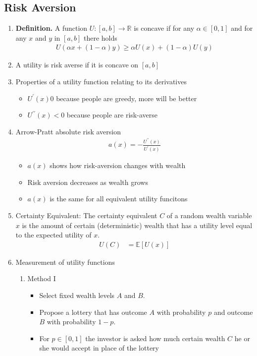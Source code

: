 \documentclass[12pt,twoside]{article}
\begin{document}
\subsection{Risk Aversion}
\begin{enumerate}
	\item \textbf{Definition.} A function $U: [a,b] \rightarrow \mathbb{R}$ is concave if for any $\alpha \in [0,1]$ and for any $x$ and $y$ in $[a,b]$ there holds 
	\begin{align*}
		U\left(\alpha x + (1-\alpha) y\right) \geq \alpha U(x)  + (1-\alpha) U(y)
	\end{align*}

	\item A utility is risk averse if it is concave on $[a,b]$

	\item Properties of a utility function relating to its derivatives
		\begin{itemize}
			\item $U^\prime(x) 0$ because people are greedy, more will be better
			\item $U^{\prime\prime}(x) < 0$  because people are risk-averse
		\end{itemize}

	\item Arrow-Pratt absolute risk aversion 
	\begin{align*}
		a(x) = - \frac{U^{\prime\prime}(x)}{U^\prime(x)}
	\end{align*}
	
		\begin{itemize}
			\item $a(x)$ shows how risk-aversion changes with wealth
			\item Risk aversion decreases as wealth grows
			\item $a(x)$ is the same for all equivalent utility funcitons
		\end{itemize}
		
	\item Certainty Equivalent: The certainty equivalent $C$ of a random wealth variable $x$ is the amount of certain (deterministic) wealth that has a utility level equal to the expected utility of $x$.
	\begin{align*}
		U(C) 	& = \mathbb{E}[U(x)]
	\end{align*}
	
	\item Measurement of utility functions
		\begin{enumerate}
			\item Method I
				\begin{itemize}
					\item Select fixed wealth levels $A$ and $B$.
					\item Propose a lottery that has outcome $A$ with probability $p$ and outcome $B$ with probability $1-p$.
					\item For $p\in [0,1]$ the investor is asked how much certain wealth $C$ he or she would accept in place of the lottery
				\end{itemize}
										

\end{enumerate}
\end{enumerate}
\end{document}

